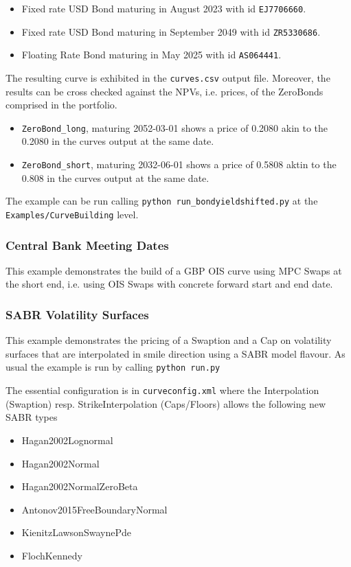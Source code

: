 \begin{itemize}
\item Fixed rate USD Bond maturing in August 2023 with id {\tt EJ7706660}.
\item Fixed rate USD Bond maturing in September 2049 with id {\tt ZR5330686}.
\item Floating Rate Bond maturing in May 2025 with id {\tt AS064441}.
\end{itemize}

The resulting curve is exhibited in the {\tt curves.csv} output file.
Moreover, the results can be cross checked against the NPVs, i.e. prices, of the ZeroBonds comprised in the portfolio.
\begin{itemize}
\item {\tt ZeroBond\_long}, maturing 2052-03-01 shows a price of 0.2080 akin to the 0.2080 in the curves output at the same date.
\item {\tt ZeroBond\_short}, maturing 2032-06-01 shows a price of 0.5808 aktin to the 0.808 in the curves output at the same date.
\end{itemize}

The example can be run calling {\tt python run\_bondyieldshifted.py} at the {\tt Examples/CurveBuilding} level.

\subsubsection{Central Bank Meeting Dates}

This example demonstrates the build of a GBP OIS curve using MPC Swaps at the short end,
i.e. using OIS Swaps with concrete forward start and end date.

\subsubsection{SABR Volatility Surfaces}

This example demonstrates the pricing of a Swaption and a Cap on
volatility surfaces that are interpolated in smile direction using a SABR
model flavour. As usual the example is run by calling {\tt python run.py}

The essential configuration is in {\tt curveconfig.xml} where the
Interpolation (Swaption) resp. StrikeInterpolation (Caps/Floors) allows
the following new SABR types
\begin{itemize}
\item Hagan2002Lognormal
\item Hagan2002Normal
\item Hagan2002NormalZeroBeta
\item Antonov2015FreeBoundaryNormal
\item KienitzLawsonSwaynePde
\item FlochKennedy
\end{itemize}

